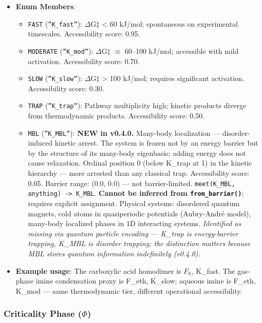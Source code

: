 \documentclass[12pt,a4paper]{article}
\begin{document}
\begin{itemize}
    \item 
    \textbf{Enum Members}:

    \begin{itemize}
    \item \texttt{FAST} (\texttt{''K\_fast''}): $\Delta$G‡ \textless{} 60 kJ/mol; spontaneous on experimental timescales. Accessibility score: 0.95.
    \item \texttt{MODERATE} (\texttt{''K\_mod''}): $\Delta$G‡ $\approx$ 60--100 kJ/mol; accessible with mild activation. Accessibility score: 0.70.
    \item \texttt{SLOW} (\texttt{''K\_slow''}): $\Delta$G‡ \textgreater{} 100 kJ/mol; requires significant activation. Accessibility score: 0.30.
    \item \texttt{TRAP} (\texttt{''K\_trap''}): Pathway multiplicity high; kinetic products diverge from thermodynamic products. Accessibility score: 0.50.
    \item \texttt{MBL} (\texttt{''K\_MBL''}): \textbf{NEW in v0.4.0.} Many-body localization --- disorder-induced kinetic arrest. The system is frozen not by an energy barrier but by the structure of its many-body eigenbasis; adding energy does not cause relaxation. Ordinal position 0 (below K\_trap at 1) in the kinetic hierarchy --- more arrested than any classical trap. Accessibility score: 0.05. Barrier range: (0.0, 0.0) --- not barrier-limited. \texttt{meet(K\_MBL, anything) -\textgreater{} K\_MBL}. \textbf{Cannot be inferred from \texttt{from\_barrier()}}; requires explicit assignment. Physical systems: disordered quantum magnets, cold atoms in quasiperiodic potentials (Aubry-André model), many-body localized phases in 1D interacting systems. \emph{Identified as missing via quantum particle encoding --- K\_trap is energy-barrier trapping, K\_MBL is disorder trapping; the distinction matters because MBL stores quantum information indefinitely (v0.4.0).}
\end{itemize}

    \item \textbf{Example usage}: The carboxylic acid homodimer is $F_{\hbar}$, K\_fast. The gas-phase imine condensation proxy is F\_eth, K\_slow; aqueous imine is F\_eth, K\_mod --- same thermodynamic tier, different operational accessibility.
\end{itemize}

\subsubsection{Criticality Phase ($\Phi$)}
\end{document}
